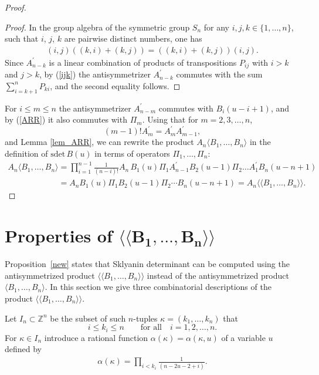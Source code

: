 \documentclass[pdftex]{sigma}
\newcommand{\ZZ}{\mathbb Z}    %
\begin{document}
\begin{proof}
\begin{proof}
In the group algebra of the symmetric group  $S_n$ for any $i,j,k\in\{1,\dots, n\}$, such that $i$, $j$, $k$ are pairwise distinct numbers, one has
\begin{gather}\label{ijk}
(i,j)((k,i)+(k,j))=((k,i)+(k,j))(i,j).
\end{gather}
Since $A^{\prime}_{n-k}$ is a linear combination of products of  transpositions $P_{ij}$ with  $i>k$ and $ j>k $,  by (\ref{ijk})  the antisymmetrizer  $A^{\prime}_{n-k}$ commutes with the sum $\sum_{i=k+1}^{n}P_{ki}$, and the second equality follows.
\end{proof}

 For  $i\le m\le n$ the antisymmetrizer $A^{\prime}_{n-m}$ commutes with $B_i(u-i+1)$,
and by (\ref{ARR}) it also commutes with $\Pi_m$.
Using that for $m=2, 3,\dots, n $,
\[
(m-1)!A^{\prime}_m=A^{\prime}_mA^{\prime}_{m-1},
\]
and Lemma \ref{lem_ARR}, we can   rewrite the product  $A_n \langle  B_1, \dots, B_n\rangle $ in  the def\/inition of $\text{sdet}\, B(u)$ in terms of operators $\Pi_1,\dots, \Pi_n$:
 \begin{gather*}
 A_n \langle  B_1, \dots, B_n\rangle
=  { \prod_{i=1}^{n-1}\frac{1}{(n-i)!}}
   A_n\,B_1(u) \Pi_1A^{\prime}_{n-1}B_2(u-1)\Pi_2\dots A^{\prime}_{1}
B_n(u-n+1)\\
\phantom{A_n \langle  B_1, \dots, B_n\rangle   }{}
=  A_n B_1(u) \Pi_1B_2(u-1)\Pi_2 \cdots
B_n(u-n+1)=A_n \langle \langle  B_1, \dots, B_n\rangle \rangle .\tag*{\qed}
\end{gather*}
\renewcommand{\qed}{}
\end{proof}

\section[Properties of $\langle \langle  B_1, \dots, B_n\rangle \rangle $]{Properties of $\boldsymbol{\langle \langle  B_1, \dots, B_n\rangle \rangle }$}\label{section3}

Proposition~\ref{new}  states that Sklyanin determinant  can be computed  using the  antisymmetrized product  $\langle \langle  B_1, \dots, B_n\rangle \rangle $ instead of the antisymmetrized  product   $\langle  B_1, \dots, B_n\rangle $. In this section   we  give three  combinatorial  descriptions of the product $\langle \langle  B_1, \dots, B_n\rangle \rangle $.

Let $I_n\subset \ZZ^n$  be the subset of such $n$-tuples $\kappa=(k_1, \dots, k_n)$ that
\[
i\le k_i\le n \qquad \text{for all}\quad i=1,2,\dots, n.
\]
 For $\kappa\in I_n$ introduce  a rational function $\alpha{(\kappa)}=\alpha{(\kappa,u)}$ of   a variable $u$ def\/ined by
\begin{gather*}%
\alpha{(\kappa)}=
{\prod_{i< k_{i}} \frac{1}{(n-2u-2+i)}}.
\end{gather*}
\end{document}
